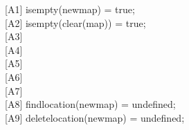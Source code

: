 \documentclass[12pt]{article}
\begin{document}
\begin{spacing}{1.5}
\hspace*{5mm} [A1] isempty(newmap) = true;\\
\hspace*{5mm} [A2] isempty(clear(map)) = true;\\
\hspace*{5mm} [A3] \\
\hspace*{5mm} [A4] \\
\hspace*{5mm} [A5] \\
\hspace*{5mm} [A6] \\
\hspace*{5mm} [A7] \\
\hspace*{5mm} [A8] findlocation(newmap) = undefined;\\
\hspace*{5mm} [A9] deletelocation(newmap) = undefined;\\

\end{spacing}
\end{document}

